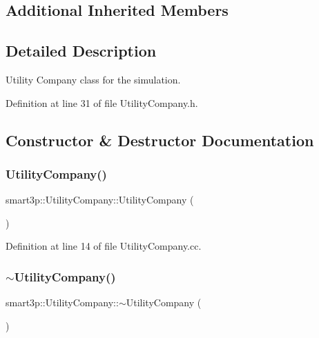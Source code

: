 \subsection*{Additional Inherited Members}


\subsection{Detailed Description}
Utility Company class for the simulation. 

Definition at line 31 of file Utility\+Company.\+h.



\subsection{Constructor \& Destructor Documentation}
\mbox{\label{classsmart3p_1_1UtilityCompany_a2f1eef975aa1798f09da1c1fa79abbe9}} 
\subsubsection{\texorpdfstring{Utility\+Company()}{UtilityCompany()}}
{\footnotesize\ttfamily smart3p\+::\+Utility\+Company\+::\+Utility\+Company (\begin{DoxyParamCaption}{ }\end{DoxyParamCaption})}



Definition at line 14 of file Utility\+Company.\+cc.

\mbox{\label{classsmart3p_1_1UtilityCompany_a6f820a1b7abefa4b2a3cfbe694c7bfc6}} 
\subsubsection{\texorpdfstring{$\sim$\+Utility\+Company()}{~UtilityCompany()}}
{\footnotesize\ttfamily smart3p\+::\+Utility\+Company\+::$\sim$\+Utility\+Company (\begin{DoxyParamCaption}{ }\end{DoxyParamCaption})}



